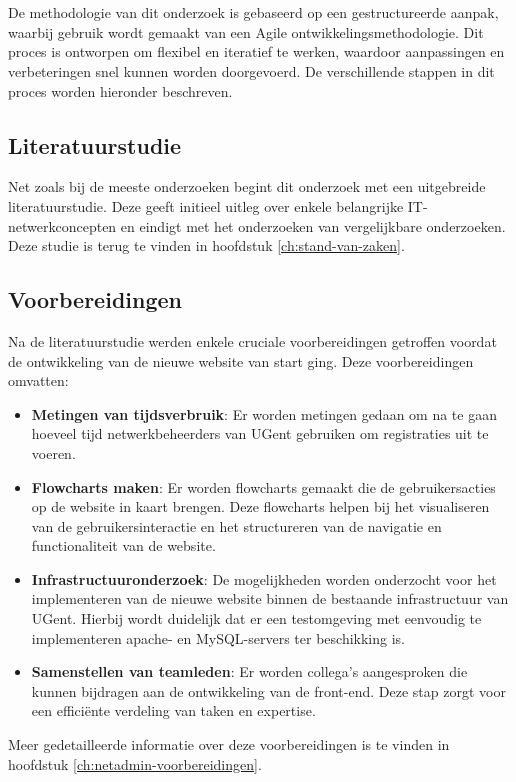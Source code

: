 
\chapter{}%
\label{ch:methodologie}

De methodologie van dit onderzoek is gebaseerd op een gestructureerde aanpak, waarbij gebruik wordt gemaakt van een Agile ontwikkelingsmethodologie. Dit proces is ontworpen om flexibel en iteratief te werken, waardoor aanpassingen en verbeteringen snel kunnen worden doorgevoerd. De verschillende stappen in dit proces worden hieronder beschreven.

\section{Literatuurstudie}
Net zoals bij de meeste onderzoeken begint dit onderzoek met een uitgebreide literatuurstudie. Deze geeft initieel uitleg over enkele belangrijke IT-netwerkconcepten en eindigt met het onderzoeken van vergelijkbare onderzoeken. Deze studie is terug te vinden in hoofdstuk \ref{ch:stand-van-zaken}.

\section{Voorbereidingen}
Na de literatuurstudie werden enkele cruciale voorbereidingen getroffen voordat de ontwikkeling van de nieuwe website van start ging. Deze voorbereidingen omvatten:
\begin{itemize}
    \item \textbf{Metingen van tijdsverbruik}: Er worden metingen gedaan om na te gaan hoeveel tijd netwerkbeheerders van UGent gebruiken om registraties uit te voeren.
    \item \textbf{Flowcharts maken}: Er worden flowcharts gemaakt die de gebruikersacties op de website in kaart brengen. Deze flowcharts helpen bij het visualiseren van de gebruikersinteractie en het structureren van de navigatie en functionaliteit van de website.
    \item \textbf{Infrastructuuronderzoek}: De mogelijkheden worden onderzocht voor het implementeren van de nieuwe website binnen de bestaande infrastructuur van UGent. Hierbij wordt duidelijk dat er een testomgeving met eenvoudig te implementeren apache- en MySQL-servers ter beschikking is.
    \item \textbf{Samenstellen van teamleden}: Er worden collega's aangesproken die kunnen bijdragen aan de ontwikkeling van de front-end. Deze stap zorgt voor een efficiënte verdeling van taken en expertise.
\end{itemize}
Meer gedetailleerde informatie over deze voorbereidingen is te vinden in hoofdstuk \ref{ch:netadmin-voorbereidingen}.

